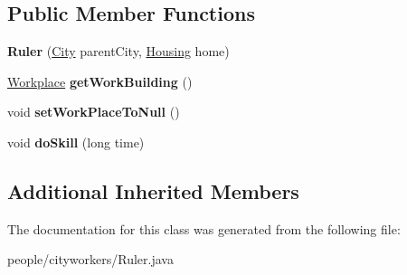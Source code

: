 \subsection*{Public Member Functions}
\begin{DoxyCompactItemize}
\item 
{\bfseries Ruler} (\hyperlink{classcities_1_1_city}{City} parent\+City, \hyperlink{classbuildings_1_1housing_1_1_housing}{Housing} home)\hypertarget{classpeople_1_1cityworkers_1_1_ruler_a7841dde83f1ed51de50d7ca9cac0d9bf}{}\label{classpeople_1_1cityworkers_1_1_ruler_a7841dde83f1ed51de50d7ca9cac0d9bf}

\item 
\hyperlink{classbuildings_1_1workplaces_1_1_workplace}{Workplace} {\bfseries get\+Work\+Building} ()\hypertarget{classpeople_1_1cityworkers_1_1_ruler_a43a857b1b8ddc36be78988bbecc5bfec}{}\label{classpeople_1_1cityworkers_1_1_ruler_a43a857b1b8ddc36be78988bbecc5bfec}

\item 
void {\bfseries set\+Work\+Place\+To\+Null} ()\hypertarget{classpeople_1_1cityworkers_1_1_ruler_a4ca77c5e5e4aa66ccc5bf9bff4f65223}{}\label{classpeople_1_1cityworkers_1_1_ruler_a4ca77c5e5e4aa66ccc5bf9bff4f65223}

\item 
void {\bfseries do\+Skill} (long time)\hypertarget{classpeople_1_1cityworkers_1_1_ruler_aeeec53fcc53da75937780993485152e9}{}\label{classpeople_1_1cityworkers_1_1_ruler_aeeec53fcc53da75937780993485152e9}

\end{DoxyCompactItemize}
\subsection*{Additional Inherited Members}


The documentation for this class was generated from the following file\+:\begin{DoxyCompactItemize}
\item 
people/cityworkers/Ruler.\+java\end{DoxyCompactItemize}
